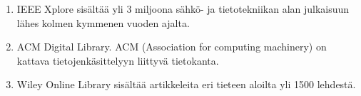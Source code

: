 \begin{enumerate}
    \item{IEEE Xplore sisältää yli 3 miljoona sähkö- ja tietotekniikan alan julkaisuun lähes kolmen kymmenen vuoden ajalta.}
    \item{ACM Digital Library. ACM (Association for computing machinery) on kattava tietojenkäsittelyyn liittyvä tietokanta.}
    \item{Wiley Online Library sisältää artikkeleita eri tieteen aloilta yli 1500 lehdestä.}
\end{enumerate}
